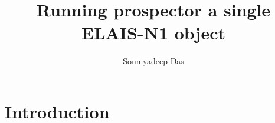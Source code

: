 \documentclass[11pt]{article}
\title{\bf Running prospector a single ELAIS-N1 object}
\author{Soumyadeep Das}
\begin{document}
\maketitle

\hline

\section{Introduction}



\end{document}
